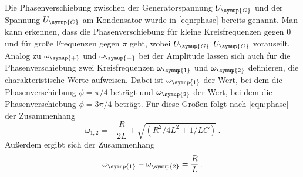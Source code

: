 Die Phasenverschiebung zwischen der Generatorspannung $U_{\symup{G}}$ und der
Spannung $U_{\symup{C}}$ am Kondensator wurde in \eqref{eqn:phase} bereits genannt.
Man kann erkennen, dass die Phasenverschiebung für kleine Kreisfrequenzen gegen
$0$ und für große Frequenzen gegen $\pi$ geht, wobei $U_{\symup{G}}$ $U_{\symup{C}}$
vorauseilt. Analog zu $\omega_{\symup{+}}$ und $\omega_{\symup{-}}$ bei der Amplitude
lassen sich auch für die Phasenverschiebung zwei Kreisfrequenzen $\omega_{\symup{1}}$
und $\omega_{\symup{2}}$ definieren, die charakteristische Werte aufweisen. Dabei
ist $\omega_{\symup{1}}$ der Wert, bei dem die Phasenverschiebung $\phi=\pi/4$ beträgt
und $\omega_{\symup{2}}$ der Wert, bei dem die Phasenverschiebung $\phi=3\pi/4$ beträgt.
Für diese Größen folgt nach \eqref{eqn:phase} der Zusammenhang
\begin{equation}
  \omega_{1,2} = \pm \frac{R}{2L} + \sqrt{(R^2/4L^2+1/LC)}\,.
  \label{eqn:omega12}
\end{equation}
Außerdem ergibt sich der Zusammenhang
\begin{equation}
  \omega_{\symup{1}}-\omega_{\symup{2}}=\frac{R}{L}\,.
\end{equation}

